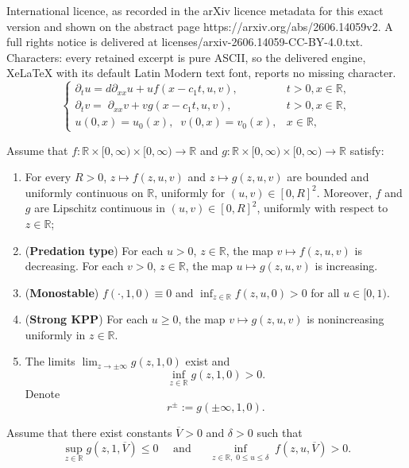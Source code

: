 \documentclass[10pt,a4paper]{amsart}
\newcommand{\R}{\mathbb{R}}
\begin{document}
International licence, as recorded in the arXiv licence metadata for this exact version and shown on the abstract page https://arxiv.org/abs/2606.14059v2. A full rights notice is delivered at licenses/arxiv-2606.14059-CC-BY-4.0.txt. Characters: every retained excerpt is pure ASCII, so the delivered engine, XeLaTeX with its default Latin Modern text font, reports no missing character.
\begin{equation}\label{Pb}
\begin{cases}
\partial_t u= d \partial_{xx} u  +  u f(x-c_1t, u,v),  & t>0, x\in \R,\\
\partial_t v= \; \partial_{xx} v + vg( x-c_1 t,  u,  v ),  & t>0, x\in \R, \\
u(0, x)=u_0(x), \;\; v(0, x)= v_0(x), & x\in \R,
\end{cases}
\end{equation}

\begin{assumption}\label{Ass-fg}
Assume that $f: \R \times [0, \infty)\times  [0, \infty) \to \R$ and $g: \R \times [0, \infty)\times  [0, \infty) \to \R$   satisfy: 
\begin{enumerate}
\item[(i)]  For every $R>0$,  $z \mapsto f(z,u,v)$ and $z \mapsto g(z,u,v )$ are bounded and uniformly continuous on $\R$, uniformly for $(u,v) \in [0, R]^2$.  Moreover,   $f$ and  $g $ are Lipschitz continuous in $(u,v)\in [0,R]^2$,  uniformly  with respect to $z\in \R$;
\item [(ii)]  (\textbf{Predation type}) For each $u>0$, $z\in \R$, the  map  $v\mapsto f(z,u, v)$ is decreasing. For each $v>0$,  $z\in \R$, the map $u\mapsto g(z,u,v)$  is increasing.
\item[(iii)] (\textbf{Monostable}) $f(\cdot, 1,0) \equiv 0$ and $\inf_{z\in \R} f(z,u, 0)> 0$ for all $u\in [0, 1)$. 
\item [(iv)] (\textbf{Strong KPP}) For each $u\geq 0$,  the map  $v \mapsto g(z, u, v)$ is nonincreasing uniformly in $z\in \R$.  
\item [(v)] The limits $\lim_{z\to \pm \infty} g(z, 1,0 )$ exist  and 
$$\inf_{z\in \R} g(z, 1, 0) >0. $$
 Denote
\begin{equation}\label{rrr}
r^{\pm} := g(\pm \infty , 1, 0).
\end{equation}

\end{enumerate}
\end{assumption}

\begin{assumption} \label{Ass-bound}
Assume that there exist constants $\overline{V}>0$  and $\delta>0$ such that
$$  \sup_{z\in\R} g(z,1,\overline{V})\leq 0   \quad
\text{ and  } \quad
\inf_{\substack{z\in \R, \; 0\leq u\leq \delta}} f(z,u, \overline {V})> 0.
$$
\end{assumption}
\end{document}
